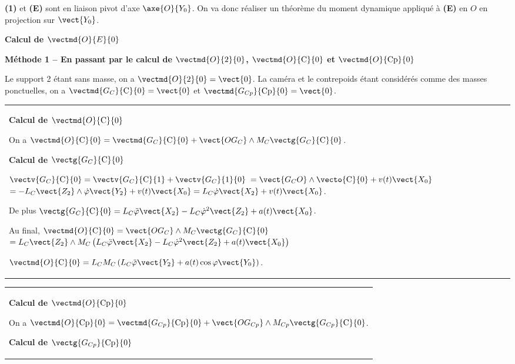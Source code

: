 \ifprof
\begin{corrige}
\textbf{(1)} et \textbf{(E)} sont en liaison pivot d'axe $\axe{O}{Y_0}$. On va donc réaliser un théorème du moment dynamique appliqué à \textbf{(E)} en $O$ en projection sur $\vect{Y_0}$. 

\textbf{Calcul de $\vectmd{O}{E}{0}$}

\textbf{Méthode 1 -- En passant par le calcul de $\vectmd{O}{\text{2}}{0}$, $\vectmd{O}{\text{C}}{0}$ et $\vectmd{O}{\text{Cp}}{0}$}


Le support 2 étant sans masse, on a $\vectmd{O}{\text{2}}{0}=\vect{0}$. La caméra et le contrepoids étant considérés comme des masses ponctuelles, on a $\vectmd{G_C}{\text{C}}{0}=\vect{0}$ et $\vectmd{G_{Cp}}{\text{Cp}}{0}=\vect{0}$.

 \begin{tabular}{|p{.9\linewidth}}
\textbf{Calcul de $\vectmd{O}{\text{C}}{0}$}

 On a $\vectmd{O}{\text{C}}{0} = \vectmd{G_{C}}{\text{C}}{0}+\vect{OG_C} \wedge M_C\vectg{G_{C}}{\text{C}}{0}$.
 
\textbf{Calcul de $\vectg{G_{C}}{\text{C}}{0}$}

$\vectv{G_C}{\text{C}}{0}=\vectv{G_C}{\text{C}}{1}+\vectv{G_C}{\text{1}}{0}$ $=\vect{G_CO}\wedge \vecto{\text{C}}{0}+v(t)\vect{X_0}$ $=-L_C\vect{Z_2}\wedge \dot{\varphi}\vect{Y_2}+v(t)\vect{X_0}=L_C \dot{\varphi}\vect{X_2}+v(t)\vect{X_0}$.

De plus  $\vectg{G_C}{\text{C}}{0}=L_C \ddot{\varphi}\vect{X_2}-L_C \dot{\varphi}^2\vect{Z_2}+a(t)\vect{X_0}$.

Au final, $\vectmd{O}{\text{C}}{0} = \vect{OG_C} \wedge M_C\vectg{G_{C}}{\text{C}}{0}$
$ =L_C\vect{Z_2} \wedge M_C \left( L_C \ddot{\varphi}\vect{X_2}-L_C \dot{\varphi}^2\vect{Z_2}+a(t)\vect{X_0} \right)$

$\vectmd{O}{\text{C}}{0} =L_C M_C \left( L_C \ddot{\varphi}\vect{Y_2} +a(t) \cos \varphi \vect{Y_0} \right)$.

\end{tabular}

\vspace{.25cm}

 \begin{tabular}{|p{.9\linewidth}}
\textbf{Calcul de $\vectmd{O}{\text{Cp}}{0}$}

 On a $\vectmd{O}{\text{Cp}}{0} = \vectmd{G_{Cp}}{\text{Cp}}{0}+\vect{OG_{Cp}} \wedge M_{Cp}\vectg{G_{Cp}}{\text{C}}{0}$.

\textbf{Calcul de $\vectg{G_{Cp}}{\text{Cp}}{0}$}


\end{tabular}
\end{corrige}
